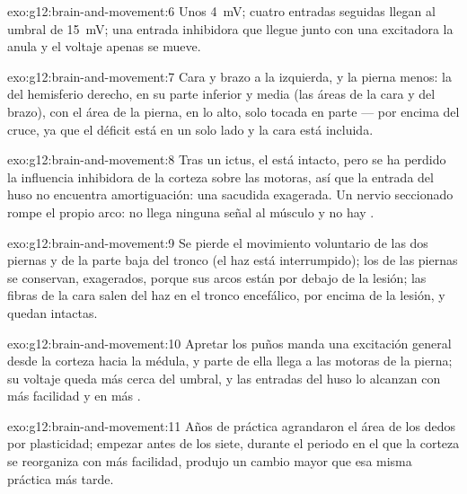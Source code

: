\begin{solution}{exo:g12:brain-and-movement:6}
Unos \qty{4}{mV}; cuatro entradas seguidas llegan al umbral de
\qty{15}{mV}; una entrada inhibidora que llegue junto con una
excitadora la anula y el voltaje apenas se mueve.
\end{solution}

\begin{solution}{exo:g12:brain-and-movement:7}
Cara y brazo a la izquierda, y la pierna menos: la  del
hemisferio derecho, en su parte inferior y media (las áreas de la cara
y del brazo), con el área de la pierna, en lo alto, solo tocada en
parte --- por encima del cruce, ya que el déficit está en un solo lado
y la cara está incluida.
\end{solution}

\begin{solution}{exo:g12:brain-and-movement:8}
Tras un ictus, el  está intacto, pero se ha perdido la
influencia inhibidora de la corteza sobre las  motoras, así que
la entrada del huso no encuentra amortiguación: una sacudida exagerada.
Un nervio seccionado rompe el propio arco: no llega ninguna señal al
músculo y no hay .
\end{solution}

\begin{solution}{exo:g12:brain-and-movement:9}
Se pierde el movimiento voluntario de las dos piernas y de la parte
baja del tronco (el haz está interrumpido); los  de las piernas
se conservan, exagerados, porque sus arcos están por debajo de la
lesión; las fibras de la cara salen del haz en el tronco encefálico,
por encima de la lesión, y quedan intactas.
\end{solution}

\begin{solution}{exo:g12:brain-and-movement:10}
Apretar los puños manda una excitación general desde la corteza hacia
la médula, y parte de ella llega a las  motoras de la pierna;
su voltaje queda más cerca del umbral, y las entradas del huso lo
alcanzan con más facilidad y en más .
\end{solution}

\begin{solution}{exo:g12:brain-and-movement:11}
Años de práctica agrandaron el área de los dedos por plasticidad;
empezar antes de los siete, durante el periodo en el que la corteza se
reorganiza con más facilidad, produjo un cambio mayor que esa misma
práctica más tarde.
\end{solution}

